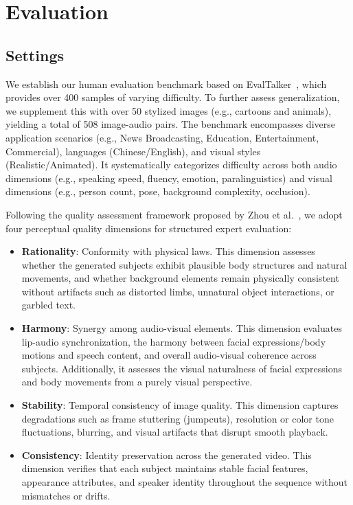 \section{Evaluation}




\subsection{Settings}

We establish our human evaluation benchmark based on EvalTalker~\cite{zhou2025evaltalker}, which provides over 400 samples of varying difficulty. To further assess generalization, we supplement this with over 50 stylized images (e.g., cartoons and animals), yielding a total of 508 image-audio pairs. The benchmark encompasses diverse application scenarios (e.g., News Broadcasting, Education, Entertainment, Commercial), languages (Chinese/English), and visual styles (Realistic/Animated). It systematically categorizes difficulty across both audio dimensions (e.g., speaking speed, fluency, emotion, paralinguistics) and visual dimensions (e.g., person count, pose, background complexity, occlusion).

Following the quality assessment framework proposed by Zhou et al.~\cite{zhou2025evaltalker}, we adopt four perceptual quality dimensions for structured expert evaluation:

\begin{itemize}
    \item \textbf{Rationality}: Conformity with physical laws. This dimension assesses whether the generated subjects exhibit plausible body structures and natural movements, and whether background elements remain physically consistent without artifacts such as distorted limbs, unnatural object interactions, or garbled text.
    
    \item \textbf{Harmony}: Synergy among audio-visual elements. This dimension evaluates lip-audio synchronization, the harmony between facial expressions/body motions and speech content, and overall audio-visual coherence across subjects. Additionally, it assesses the visual naturalness of facial expressions and body movements from a purely visual perspective.
    
    \item \textbf{Stability}: Temporal consistency of image quality. This dimension captures degradations such as frame stuttering (jumpcuts), resolution or color tone fluctuations, blurring, and visual artifacts that disrupt smooth playback.
    
    \item \textbf{Consistency}: Identity preservation across the generated video. This dimension verifies that each subject maintains stable facial features, appearance attributes, and speaker identity throughout the sequence without mismatches or drifts.
\end{itemize}

